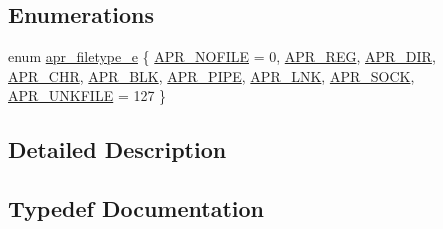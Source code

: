 \subsection*{Enumerations}
\begin{DoxyCompactItemize}
\item 
enum \mbox{\hyperlink{group__apr__file__info_gae3f0ce3014337a52b39852f8bf81ca7c}{apr\+\_\+filetype\+\_\+e}} \{ \newline
\mbox{\hyperlink{group__apr__file__info_ggae3f0ce3014337a52b39852f8bf81ca7cae5877c29ba5fd483edbde0c51c0ac5e9}{A\+P\+R\+\_\+\+N\+O\+F\+I\+LE}} = 0, 
\mbox{\hyperlink{group__apr__file__info_ggae3f0ce3014337a52b39852f8bf81ca7ca9a2849ad21618c937683c1ffe13a6257}{A\+P\+R\+\_\+\+R\+EG}}, 
\mbox{\hyperlink{group__apr__file__info_ggae3f0ce3014337a52b39852f8bf81ca7cae2ee810fa994ae64b8fcc6b68d3ae540}{A\+P\+R\+\_\+\+D\+IR}}, 
\mbox{\hyperlink{group__apr__file__info_ggae3f0ce3014337a52b39852f8bf81ca7cadb769ffbe8659cbecf7ebf376d098d37}{A\+P\+R\+\_\+\+C\+HR}}, 
\newline
\mbox{\hyperlink{group__apr__file__info_ggae3f0ce3014337a52b39852f8bf81ca7ca20ea6a09a69785a7cd19fd05243c1c8d}{A\+P\+R\+\_\+\+B\+LK}}, 
\mbox{\hyperlink{group__apr__file__info_ggae3f0ce3014337a52b39852f8bf81ca7ca247719668cd02286a6a0ed767c30ce77}{A\+P\+R\+\_\+\+P\+I\+PE}}, 
\mbox{\hyperlink{group__apr__file__info_ggae3f0ce3014337a52b39852f8bf81ca7ca2b55a6db64d814bf08d5a56b026a8176}{A\+P\+R\+\_\+\+L\+NK}}, 
\mbox{\hyperlink{group__apr__file__info_ggae3f0ce3014337a52b39852f8bf81ca7cadd5d86c1e616fe159a7ec04e0ddc70db}{A\+P\+R\+\_\+\+S\+O\+CK}}, 
\newline
\mbox{\hyperlink{group__apr__file__info_ggae3f0ce3014337a52b39852f8bf81ca7ca3347d2110d62ce464ddf1ae38759e6b0}{A\+P\+R\+\_\+\+U\+N\+K\+F\+I\+LE}} = 127
 \}
\end{DoxyCompactItemize}


\subsection{Detailed Description}


\subsection{Typedef Documentation}
\mbox{\label{group__apr__file__info_gae2c25c4b679613081599f776efa96c4a}} 
